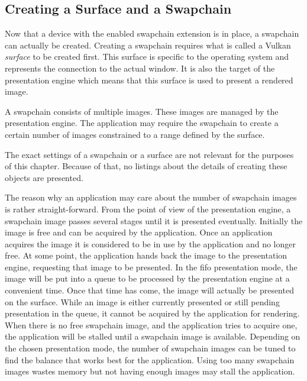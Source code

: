     \subsection{Creating a Surface and a Swapchain}
      Now that a device with the enabled swapchain extension is in place, a swapchain can actually be created.
      Creating a swapchain requires what is called a Vulkan \textit{surface} to be created first.
      This surface is specific to the operating system and represents the connection to the actual window.
      It is also the target of the presentation engine which means that this surface is used to present a rendered image.

      A swapchain consists of multiple images.
      These images are managed by the presentation engine.
      The application may require the swapchain to create a certain number of images constrained to a range defined by the surface.

      The exact settings of a swapchain or a surface are not relevant for the purposes of this chapter.
      Because of that, no listings about the details of creating these objects are presented.

      The reason why an application may care about the number of swapchain images is rather straight-forward.
      From the point of view of the presentation engine, a swapchain image passes several stages until it is presented eventually.
      Initially the image is free and can be acquired by the application.
      Once an application acquires the image it is considered to be in use by the application and no longer free.
      At some point, the application hands back the image to the presentation engine, requesting that image to be presented.
      In the \gls{fifo} presentation mode, the image will be put into a queue to be processed by the presentation engine at a convenient time.
      Once that time has come, the image will actually be presented on the surface.
      While an image is either currently presented or still pending presentation in the queue, it cannot be acquired by the application for rendering.
      When there is no free swapchain image, and the application tries to acquire one, the application will be stalled until a swapchain image is available.
      Depending on the chosen presentation mode, the number of swapchain images can be tuned to find the balance that works best for the application.
      Using too many swapchain images wastes memory but not having enough images may stall the application.

